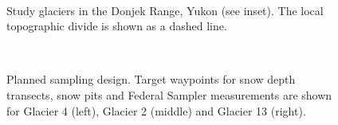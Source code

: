 \documentclass{sfuthesis}
\begin{document}
\begin{figure}
	\centering
	\\
	\caption[Study glaciers in the Donjek Range, Yukon]{Study glaciers in the Donjek Range, Yukon (see inset). The local topographic divide is shown as a dashed line.}
	\label{studysites}
\end{figure}

\begin{figure}
	\centering
	\\
	\caption[Planned sampling design]{Planned sampling design. Target waypoints for snow depth transects, snow pits and Federal Sampler measurements are shown for Glacier 4 (left), Glacier 2 (middle) and Glacier 13 (right).}
	\label{transect_planned}
	\end{figure}
\end{document}
